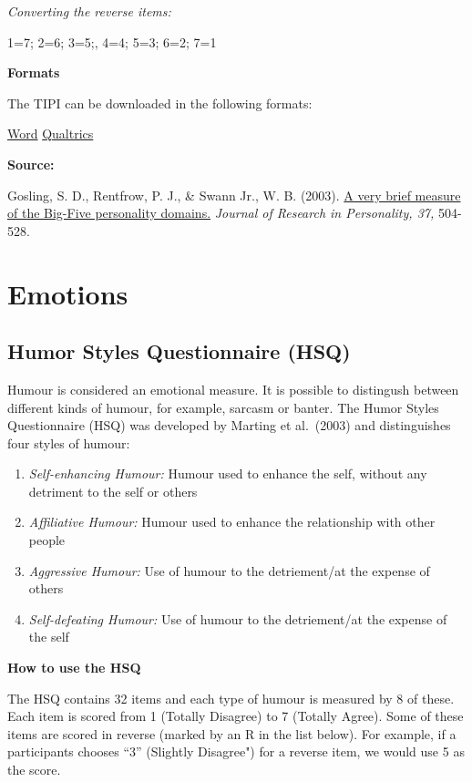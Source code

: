 \documentclass[
]{book}
\providecommand{\tightlist}{%
  \setlength{\itemsep}{0pt}\setlength{\parskip}{0pt}}
\begin{document}
\emph{Converting the reverse items:}

1=7; 2=6; 3=5;, 4=4; 5=3; 6=2; 7=1

\textbf{Formats}

The TIPI can be downloaded in the following formats:

\href{link\%20to\%20file}{Word} \textbar{} \href{link\%20to\%20file}{Qualtrics}

\textbf{Source:}

Gosling, S. D., Rentfrow, P. J., \& Swann Jr., W. B. (2003). \href{http://citeseerx.ist.psu.edu/viewdoc/download?doi=10.1.1.113.6704\&rep=rep1\&type=pdf}{A very brief measure of the Big-Five personality domains.} \emph{Journal of Research in Personality, 37,} 504-528.

\hypertarget{emotions}{%
\section{Emotions}\label{emotions}}

\hypertarget{humor-styles-questionnaire-hsq}{%
\subsection{Humor Styles Questionnaire (HSQ)}\label{humor-styles-questionnaire-hsq}}

Humour is considered an emotional measure. It is possible to distingush between different kinds of humour, for example, sarcasm or banter. The Humor Styles Questionnaire (HSQ) was developed by Marting et al.~(2003) and distinguishes four styles of humour:

\begin{enumerate}
\def\labelenumi{\arabic{enumi}.}
\tightlist
\item
  \emph{Self-enhancing Humour:} Humour used to enhance the self, without any detriment to the self or others
\item
  \emph{Affiliative Humour:} Humour used to enhance the relationship with other people
\item
  \emph{Aggressive Humour:} Use of humour to the detriement/at the expense of others
\item
  \emph{Self-defeating Humour:} Use of humour to the detriement/at the expense of the self
\end{enumerate}

\textbf{How to use the HSQ}

The HSQ contains 32 items and each type of humour is measured by 8 of these. Each item is scored from 1 (Totally Disagree) to 7 (Totally Agree). Some of these items are scored in reverse (marked by an R in the list below). For example, if a participants chooses ``3'' (Slightly Disagree") for a reverse item, we would use 5 as the score.
\end{document}
